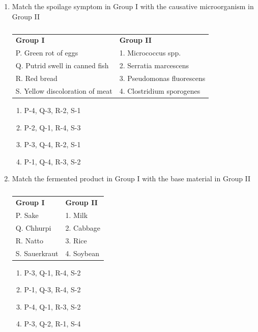 \documentclass[a4paper,10pt]{article}
\begin{document}
\begin{enumerate}
    \item Match the spoilage symptom in Group I with the causative microorganism in Group II
    \begin{table}[h!] \centering \caption*{} \label{tab:q12_food_2018}
        \begin{tabular}{ll}
            \textbf{Group I} & \textbf{Group II} \\
            P. Green rot of eggs & 1. Micrococcus spp. \\
            Q. Putrid swell in canned fish & 2. Serratia marcescens \\
            R. Red bread & 3. Pseudomonas fluorescens \\
            S. Yellow discoloration of meat & 4. Clostridium sporogenes
        \end{tabular}
    \end{table}
    \hfill{}
    \begin{enumerate}[label=\Alph*)]
        \item P-4, Q-3, R-2, S-1
        \item P-2, Q-1, R-4, S-3
        \item P-3, Q-4, R-2, S-1
        \item P-1, Q-4, R-3, S-2
    \end{enumerate}

    \item Match the fermented product in Group I with the base material in Group II
    \begin{table}[h!] \centering \caption*{} \label{tab:q13_food_2018}
        \begin{tabular}{ll}
            \textbf{Group I} & \textbf{Group II} \\
            P. Sake & 1. Milk \\
            Q. Chhurpi & 2. Cabbage \\
            R. Natto & 3. Rice \\
            S. Sauerkraut & 4. Soybean
        \end{tabular}
    \end{table}
    \hfill{}
    \begin{enumerate}[label=\Alph*)]
        \item P-3, Q-1, R-4, S-2
        \item P-1, Q-3, R-4, S-2
        \item P-4, Q-1, R-3, S-2
        \item P-3, Q-2, R-1, S-4
    \end{enumerate}


\end{enumerate}
\end{document}
